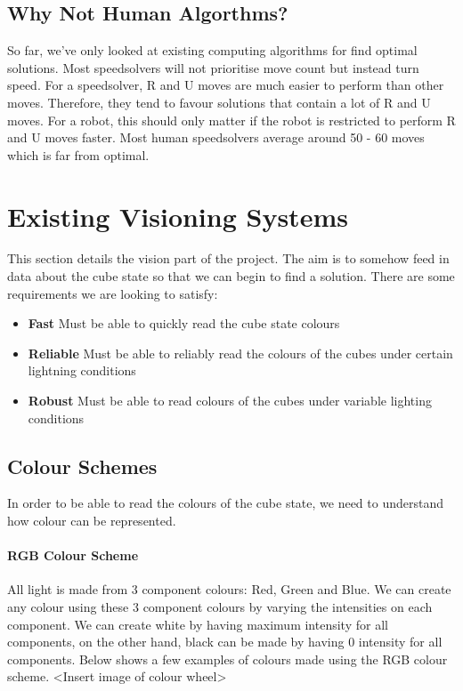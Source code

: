 \documentclass[titlepage]{report}[12pt]
\begin{document}
\subsection{Why Not Human Algorthms?}
So far, we've only looked at existing computing algorithms for find optimal solutions. Most speedsolvers will not prioritise move count but instead turn speed. For a speedsolver, R and U moves are much easier to perform than other moves. Therefore, they tend to favour solutions that contain a lot of R and U moves. For a robot, this should only matter if the robot is restricted to perform R and U moves faster. Most human speedsolvers average around 50 - 60 moves which is far from optimal.


\section{Existing Visioning Systems}
This section details the vision part of the project. The aim is to somehow feed in data about the cube state so that we can begin to find a solution. There are some requirements we are looking to satisfy:
\begin{itemize}
\item \textbf{Fast} Must be able to quickly read the cube state colours
\item \textbf{Reliable} Must be able to reliably read the colours of the cubes under certain lightning conditions 
\item \textbf{Robust} Must be able to read colours of the cubes under variable lighting conditions
\end{itemize}

\subsection{Colour Schemes}
In order to be able to read the colours of the cube state, we need to understand how colour can be represented.
\paragraph{RGB Colour Scheme}
All light is made from 3 component colours: Red, Green and Blue. We can create any colour using these 3 component colours by varying the intensities on each component. We can create white by having maximum intensity for all components, on the other hand, black can be made by having 0 intensity for all components.
Below shows a few examples of colours made using the RGB colour scheme. <Insert image of colour wheel>
\end{document}
